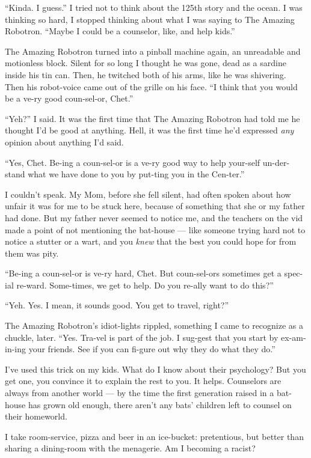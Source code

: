 ``Kinda. I guess.'' I tried not to think about the 125th story and
the ocean. I was thinking so hard, I stopped thinking about what I
was saying to The Amazing Robotron.
``Maybe I could be a counselor, like, and help kids.''

The Amazing Robotron turned into a pinball machine again, an
unreadable and motionless block. Silent for so long I thought he
was gone, dead as a sardine inside his tin can. Then, he twitched
both of his arms, like he was shivering. Then his robot-voice came
out of the grille on his face.
``I think that you would be a ve-ry good coun-sel-or, Chet.''

``Yeh?'' I said. It was the first time that The Amazing Robotron
had told me he thought I'd be good at anything. Hell, it was the
first time he'd expressed \emph{any} opinion about anything I'd
said.

``Yes, Chet. Be-ing a coun-sel-or is a ve-ry good way to help your-self 
un-der-stand what we have done to you by put-ting you in the Cen-ter.''

I couldn't speak. My Mom, before she fell silent, had often spoken
about how unfair it was for me to be stuck here, because of
something that she or my father had done. But my father never
seemed to notice me, and the teachers on the vid made a point of
not mentioning the bat-house --- like someone trying hard not to
notice a stutter or a wart, and you \emph{knew} that the best you
could hope for from them was pity.

``Be-ing a coun-sel-or is ve-ry hard, Chet. But coun-sel-ors sometimes get a 
spec-ial re-ward. Some-times, we get to help. Do you re-ally want to do this?''

``Yeh. Yes. I mean, it sounds good. You get to travel, right?''

The Amazing Robotron's idiot-lights rippled, something I came to
recognize as a chuckle, later.
``Yes. Tra-vel is part of the job. I sug-gest that you start by ex-am-in-ing 
your friends. See if you can fi-gure out why they do what they do.''

I've used this trick on my kids. What do I know about their
psychology? But you get one, you convince it to explain the rest to
you. It helps. Counselors are always from another world --- by the
time the first generation raised in a bat-house has grown old
enough, there aren't any bats' children left to counsel on their
homeworld.

\tb

I take room-service, pizza and beer in an ice-bucket: pretentious,
but better than sharing a dining-room with the menagerie. Am I
becoming a racist?

